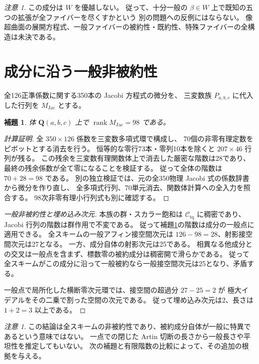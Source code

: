 \documentclass[11pt,a4paper]{ltjsarticle}
\newcommand{\QQ}{\mathbf Q}
\newcommand{\cC}{\mathcal C_{\mathrm{tq}}}
\DeclareMathOperator{\rank}{rank}
\newtheorem{lemma}[theorem]{補題}
\theoremstyle{remark}
\newtheorem{remark}[theorem]{注意}
\begin{document}
\begin{remark}
この成分は $W$ を優越しない。
従って、十分一般の $\beta\in W$ 上で既知の五つの拡張が全ファイバーを尽くすかという
別の問題への反例にはならない。
像超曲面の展開方程式、一般ファイバーの被約性・既約性、特殊ファイバーの全構造は未決である。
\end{remark}

\section{成分に沿う一般非被約性}\label{sec:nonreduced}

全126正準係数に関する350本の Jacobi 方程式の微分を、
三変数族 $P_{a,b,c}$ に代入した行列を $M_{\mathrm{Jac}}$ とする。
\begin{lemma}\label{lem:generic-jacobian}
体 $\QQ(a,b,c)$ 上で $\rank M_{\mathrm{Jac}}=98$ である。
\end{lemma}
\begin{proof}[計算証明]
全 $350\times126$ 係数を三変数多項式環で構成し、
70個の非零有理定数をピボットとする消去を行う。
恒等的な零行73本・零列10本を除くと $207\times46$ 行列が残る。
この残余を三変数有理関数体上で消去した厳密な階数は28であり、
最終の残余係数が全て零になることを検証する。
従って全体の階数は $70+28=98$ である。
別の独立検証では、元の全350物理 Jacobi 式の係数辞書から微分を作り直し、
全多項式行列、70単元消去、関数体計算への全入力を照合する。
98次非零有理小行列式も別に確認する。
\end{proof}

\begin{proof}[一般非被約性と埋め込み次元]
本族の群・スカラー飽和は $\cC$ に稠密であり、Jacobi 行列の階数は群作用で不変である。
従って補題\ref{lem:generic-jacobian}の階数は成分の一般点に適用できる。
全スキームの一般アフィン接空間次元は $126-98=28$、射影接空間次元は27となる。
一方、成分自体の射影次元は25である。
相異なる他成分との交叉は一般点を含まず、標数零の被約成分は稠密開で滑らかである。
従って全スキームがこの成分に沿って一般被約なら一般接空間次元は25となり、矛盾する。

一般点で局所化した横断零次元環では、接空間の超過分 $27-25=2$ が
極大イデアルをその二乗で割った空間の次元である。
従って埋め込み次元は2、長さは $1+2=3$ 以上である。
\end{proof}

\begin{remark}
この結論は全スキームの非被約性であり、被約成分自体が一般に特異であるという意味ではない。
一点での閉じた Artin 切断の長さから一般長さや平坦性を推定してもいない。
次の補題と有限階数の比較によって、その追加の根拠を与える。
\end{remark}
\end{document}
